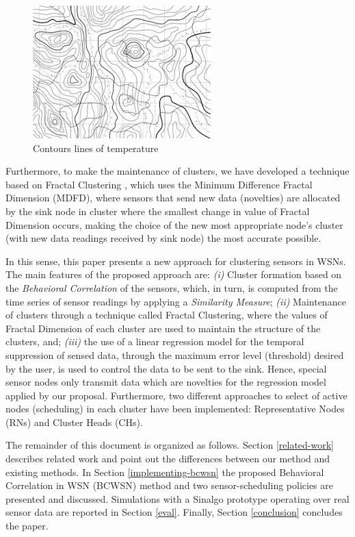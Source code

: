 \documentclass[conference]{IEEEtran}
\begin{document}
\begin{figure}[!htb]
\centering
	\includegraphics[scale=0.9]{I2.png}
    \caption{Contours lines of temperature}
    \label{fig:contour_lines}
\end{figure}

Furthermore, to make the maintenance of clusters, we have developed a technique
based on Fractal Clustering \cite{Barbara1999}, which uses the Minimum
Difference Fractal Dimension (MDFD), where sensors that send new data
(novelties) are allocated by the sink node in cluster where the smallest change
in value of Fractal Dimension occurs, making the choice of the new most
appropriate node's cluster (with new data readings received by sink node) the
most accurate possible.

In this sense, this paper presents a new approach for clustering sensors in
WSNs. The main features of the proposed approach are: {\it (i)} Cluster
formation based on the \textit{Behavioral Correlation} of the sensors, which, in
turn, is computed from the time series of sensor readings by applying a
\textit{Similarity Measure}; {\it (ii)} Maintenance of clusters through a
technique called Fractal Clustering, where the values ​​of Fractal Dimension of
each cluster are used to maintain the structure of the clusters, and; {\it
(iii)} the use of a linear regression model for the temporal suppression of
sensed data, through the maximum error level (threshold) desired by the user, is
used to control the data to be sent to the sink. Hence, special sensor nodes
only transmit data which are novelties for the regression model applied by our
proposal. Furthermore, two different approaches to select of active nodes
(scheduling) in each cluster have been implemented: Representative Nodes (RNs)
and Cluster Heads (CHs).


The remainder of this document is organized as follows. Section
\ref{related-work} describes related work and point out the differences between
our method and existing methods. In Section \ref{implementing-bcwsn} the
proposed Behavioral Correlation in WSN (BCWSN) method and two sensor-scheduling
policies are presented and discussed. Simulations with a Sinalgo prototype
operating over real sensor data are reported in Section \ref{eval}. Finally,
Section \ref{conclusion} concludes the paper.
\end{document}

